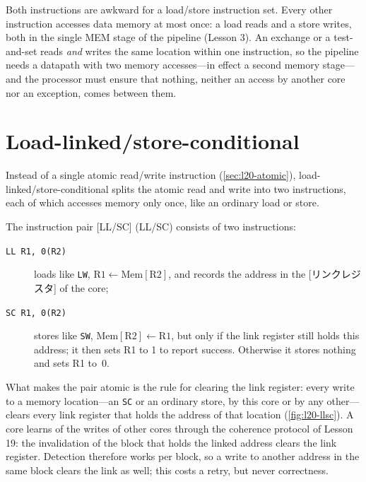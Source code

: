 \documentclass[../main.tex]{subfiles}
\begin{document}
Both instructions are awkward for a load/store instruction set.  Every other
instruction accesses data memory at most once: a load reads and a store
writes, both in the single MEM stage of the pipeline (Lesson 3).  An
exchange or a test-and-set reads \emph{and} writes the same location within
one instruction, so the pipeline needs a datapath with two memory
accesses---in effect a second memory stage---and the processor must ensure
that nothing, neither an access by another core nor an exception, comes
between them.

\section{Load-linked/store-conditional}
\label{sec:l20-llsc}

Instead of a single atomic read/write instruction (\cref{sec:l20-atomic}),
load-linked/store-conditional splits the atomic read and write into two
instructions,
each of which accesses memory only once, like an ordinary load or
store.

\begin{definition}
  The instruction pair
  [LL/SC]%
   (LL/SC) consists of two
  instructions:
  \begin{description}
    \item[\texttt{LL R1, 0(R2)}] loads like \texttt{LW},
      $\text{R1} \leftarrow \text{Mem}[\text{R2}]$, and records the address
      in the [リンクレジスタ] of the core;
    \item[\texttt{SC R1, 0(R2)}] stores like \texttt{SW},
      $\text{Mem}[\text{R2}] \leftarrow \text{R1}$, but only if the link
      register still holds this address; it then sets R1 to 1 to report
      success.  Otherwise it stores nothing and sets R1 to~0.
  \end{description}
\end{definition}

What makes the pair atomic is the rule for clearing the link register: every
write to a memory location---an \texttt{SC} or an ordinary store, by this
core or by any other---clears every link register that holds the address of
that location (\cref{fig:l20-llsc}).  A core learns of the writes of other cores through the coherence
protocol of Lesson 19: the invalidation of the block that holds the linked
address clears the link register.  Detection therefore works per block, so a
write to another address in the same block clears the link as well; this
costs a retry, but never correctness.
\end{document}
